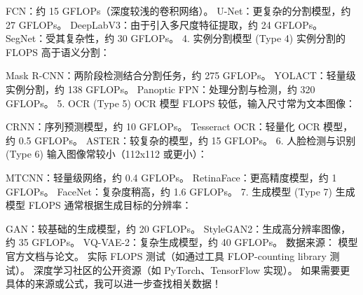 FCN：约 15 GFLOPs（深度较浅的卷积网络）。
U-Net：更复杂的分割模型，约 27 GFLOPs。
DeepLabV3：由于引入多尺度特征提取，约 24 GFLOPs。
SegNet：受其复杂性，约 30 GFLOPs。
4. 实例分割模型 (Type 4)
实例分割的 FLOPS 高于语义分割：

Mask R-CNN：两阶段检测结合分割任务，约 275 GFLOPs。
YOLACT：轻量级实例分割，约 138 GFLOPs。
Panoptic FPN：处理分割与检测，约 320 GFLOPs。
5. OCR (Type 5)
OCR 模型 FLOPS 较低，输入尺寸常为文本图像：

CRNN：序列预测模型，约 10 GFLOPs。
Tesseract OCR：轻量化 OCR 模型，约 0.5 GFLOPs。
ASTER：较复杂的模型，约 15 GFLOPs。
6. 人脸检测与识别 (Type 6)
输入图像常较小（112x112 或更小）：

MTCNN：轻量级网络，约 0.4 GFLOPs。
RetinaFace：更高精度模型，约 1 GFLOPs。
FaceNet：复杂度稍高，约 1.6 GFLOPs。
7. 生成模型 (Type 7)
生成模型 FLOPS 通常根据生成目标的分辨率：

GAN：较基础的生成模型，约 20 GFLOPs。
StyleGAN2：生成高分辨率图像，约 35 GFLOPs。
VQ-VAE-2：复杂生成模型，约 40 GFLOPs。
数据来源：
模型官方文档与论文。
实际 FLOPS 测试（如通过工具 FLOP-counting library 测试）。
深度学习社区的公开资源（如 PyTorch、TensorFlow 实现）。
如果需要更具体的来源或公式，我可以进一步查找相关数据！
